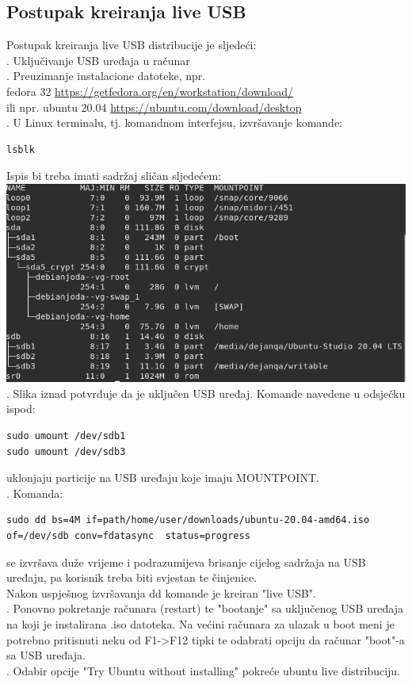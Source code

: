 \documentclass[12pt,vi]{mitthesis}
\begin{document}
\subsection*{Postupak kreiranja live USB}
\indent
Postupak kreiranja live USB distribucije je sljedeći:\\
. Uključivanje USB uređaja u računar\\
. Preuzimanje instalacione datoteke, npr.\\fedora 32 \url{https://getfedora.org/en/workstation/download/}\\
ili npr. ubuntu 20.04 \url{https://ubuntu.com/download/desktop}\\
. U Linux terminalu, tj. komandnom interfejsu, izvršavanje komande:\\
\indent
\begin{lstlisting}[style=BashInputStyle]
lsblk
\end{lstlisting}
\indent
Ispis bi treba imati sadržaj sličan sljedećem:\\
\includegraphics[width=\linewidth]{images/lsblkOutput.png}\\
. Slika iznad potvrđuje da je uključen USB uređaj. Komande navedene u odsječku ispod:
\begin{lstlisting}[style=BashInputStyle]
sudo umount /dev/sdb1
sudo umount /dev/sdb3
\end{lstlisting}
uklonjaju particije na USB uređaju koje imaju MOUNTPOINT.\\
. Komanda:
\begin{lstlisting}[style=BashInputStyle]
sudo dd bs=4M if=path/home/user/downloads/ubuntu-20.04-amd64.iso of=/dev/sdb conv=fdatasync  status=progress
\end{lstlisting}
se izvršava duže vrijeme i podrazumijeva brisanje cijelog sadržaja na USB uređaju, pa korisnik treba biti svjestan te činjenice.\\
\indent
Nakon uspješnog izvršavanja dd komande je kreiran "live USB".\\
. Ponovno pokretanje računara (restart) te "bootanje" sa uključenog USB uređaja na koji je instalirana .iso datoteka. Na većini računara za ulazak u boot meni je potrebno pritisnuti neku od F1->F12 tipki te odabrati opciju da računar "boot"-a sa USB uređaja.\\
. Odabir opcije "Try Ubuntu without installing" pokreće ubuntu live distribuciju.
\end{document}
